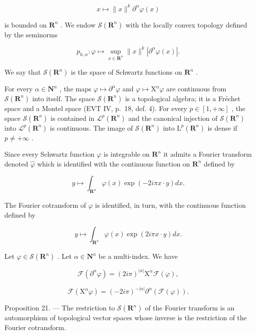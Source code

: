 \[
x \mapsto \| x \| ^ {k} \partial^ {\alpha} \varphi (x)
\]

is bounded on \(\mathbf{R}^{n}\) . We endow \(\mathcal{S}(\mathbf{R}^{n})\) with the locally convex topology defined by the seminorms

\[
p _ {k, \alpha} \colon \varphi \mapsto \sup _ {x \in \mathbf {R} ^ {n}} \| x \| ^ {k} | \partial^ {\alpha} \varphi (x) |.
\]

We say that \(\mathcal{S}(\mathbf{R}^{n})\) is the space of Schwartz functions on \(\mathbf{R}^{n}\) .

For every \(\alpha \in \mathbf{N}^n\) , the maps \(\varphi \mapsto \partial^\alpha \varphi\) and \(\varphi \mapsto \mathrm{X}^\alpha \varphi\) are continuous from \(\mathcal{S}(\mathbf{R}^n)\) into itself. The space \(\mathcal{S}(\mathbf{R}^n)\) is a topological algebra; it is a Fréchet space and a Montel space (EVT IV, p.~18, def. 4). For every \(p \in [1, +\infty]\) , the space \(\mathcal{S}(\mathbf{R}^n)\) is contained in \(\mathcal{L}^p (\mathbf{R}^n)\) and the canonical injection of \(\mathcal{S}(\mathbf{R}^n)\) into \(\mathcal{L}^p (\mathbf{R}^n)\) is continuous. The image of \(\mathcal{S}(\mathbf{R}^n)\) into \(\mathrm{L}^p (\mathbf{R}^n)\) is dense if \(p \neq +\infty\) .

Since every Schwartz function \(\varphi\) is integrable on \(\mathbf{R}^n\) it admits a Fourier transform denoted \(\widehat{\varphi}\) which is identified with the continuous function on \(\mathbf{R}^n\) defined by

\[
y \mapsto \int_ {\mathbf {R} ^ {n}} \varphi (x) \exp (- 2 i \pi x \cdot y) d x.
\]

The Fourier cotransform of \(\varphi\) is identified, in turn, with the continuous function defined by

\[
y \mapsto \int_ {\mathbf {R} ^ {n}} \varphi (x) \exp (2 i \pi x \cdot y) d x.
\]

Let \(\varphi\in\mathcal{S}(\mathbf{R}^{n})\) . Let \(\alpha\in\mathbf{N}^{n}\) be a multi-index. We have

\[
\mathcal {F} (\partial^ {\alpha} \varphi) = (2 i \pi) ^ {| \alpha |} \mathrm{X} ^ {\alpha} \mathcal {F} (\varphi),
\]

\[
\mathcal {F} (\mathrm{X} ^ {\alpha} \varphi) = (- 2 i \pi) ^ {- | \alpha |} \partial^ {\alpha} (\mathcal {F} (\varphi)).
\]

Proposition 21. — The restriction to \(\mathcal{S}(\mathbf{R}^{n})\) of the Fourier transform is an automorphism of topological vector spaces whose inverse is the restriction of the Fourier cotransform.

